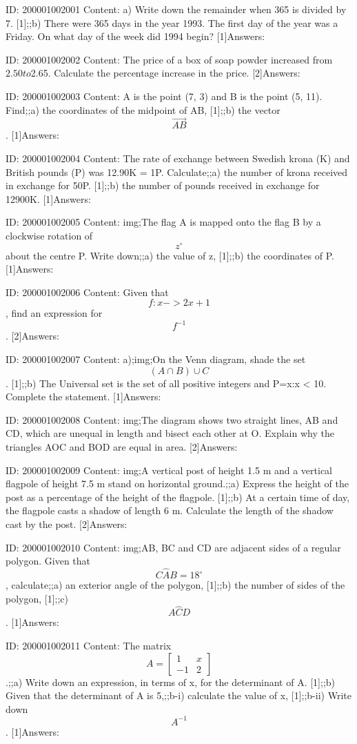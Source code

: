 \documentclass{article}
\begin{document}
ID: 200001002001
Content:
a) Write down the remainder when 365 is divided by 7. [1];;b) There were 365 days in the year 1993. The first day of the year was a Friday. On what day of the week did 1994 begin? [1]Answers:

ID: 200001002002
Content:
The price of a box of soap powder increased from $2.50 to $2.65. Calculate the percentage increase in the price. [2]Answers:

ID: 200001002003
Content:
A is the point (7, 3) and B is the point (5, 11). Find;;a) the coordinates of the midpoint of AB, [1];;b) the vector $$\vec{AB}$$. [1]Answers:

ID: 200001002004
Content:
The rate of exchange between Swedish krona (K) and British pounds (P) was 12.90K = 1P. Calculate;;a) the number of krona received in exchange for 50P. [1];;b) the number of pounds received in exchange for 12900K. [1]Answers:

ID: 200001002005
Content:
img;The flag A is mapped onto the flag B by a clockwise rotation of $$z^{\circ}$$ about the centre P. Write down;;a) the value of z, [1];;b) the coordinates of P. [1]Answers:

ID: 200001002006
Content:
Given that $$f:x->2x+1$$, find an expression for $$f^{-1}$$. [2]Answers:

ID: 200001002007
Content:
a);img;On the Venn diagram, shade the set $$(A\cap B)\cup C$$. [1];;b) The Universal set is the set of all positive integers and P={x:x < 10}. Complete the statement. [1]Answers:

ID: 200001002008
Content:
img;The diagram shows two straight lines, AB and CD, which are unequal in length and bisect each other at O. Explain why the triangles AOC and BOD are equal in area. [2]Answers:

ID: 200001002009
Content:
img;A vertical post of height 1.5 m and a vertical flagpole of height 7.5 m stand on horizontal ground.;;a) Express the height of the post as a percentage of the height of the flagpole. [1];;b) At a certain time of day, the flagpole casts a shadow of length 6 m. Calculate the length of the shadow cast by the post. [2]Answers:

ID: 200001002010
Content:
img;AB, BC and CD are adjacent sides of a regular polygon. Given that $$C \hat AB=18^{\circ}$$, calculate;;a) an exterior angle of the polygon, [1];;b) the number of sides of the polygon, [1];;c) $$A \hat CD$$. [1]Answers:

ID: 200001002011
Content:
The matrix $$A=\begin{bmatrix}1&x\\-1&2\end{bmatrix}$$.;;a) Write down an expression, in terms of x, for the determinant of A. [1];;b) Given that the determinant of A is 5,;;b-i) calculate the value of x, [1];;b-ii) Write down $$A^{-1}$$. [1]Answers:
\end{document}
